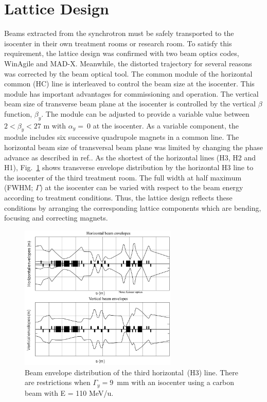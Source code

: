\documentclass[jkps,preprint,fleqn,showpacs,showkeys,10pt,twocolumn]{revtex4}
\begin{document}
\section{Lattice Design}
\label{sec:Lat}
Beams extracted from the synchrotron must be safely transported to the isocenter in their own treatment rooms or research room.
To satisfy this requirement, the lattice design was confirmed with two beam optics codes, WinAgile\cite{Agile0,Agile1} and MAD-X\cite{Schmidt}.
Meanwhile, the distorted trajectory for several reasons was corrected by the beam optical tool\cite{Chawon}.
The common module of the horizontal common (HC) line is interleaved to control the beam size at the isocenter.
This module has important advantages for commissioning and operation. 
The vertical beam size of transverse beam plane at the isocenter is controlled by the vertical $\beta$ function, $\beta_{y}$.  
The module can be adjusted to provide a variable value between $2 < \beta_{y} < 27$ m with $\alpha_{y} = ~0$ at the isocenter. 
As a variable component, the module includes six successive quadrupole magnets in a common line.
The horizontal beam size of transversal beam plane was limited by changing the phase advance as described in ref.\cite{Chawon}. 
As the shortest of the horizontal lines (H3, H2 and H1), 
Fig.~\ref{fig1} shows transverse envelope distribution by the horizontal H3 line to the isocenter of the third treatment room. 
The full width at half maximum (FWHM; $\Gamma$) at the isocenter can be varied with respect to the beam energy according to treatment conditions.
Thus, the lattice design reflects these conditions by arranging the corresponding lattice components which are bending, focusing and correcting magnets.
\begin{figure}[h]
  \begin{center}
    \includegraphics[width=7.5cm]{Fig02.png}  
    \caption{Beam envelope distribution of the third horizontal~(H3) line.
      There are restrictions when $\Gamma_{y} = 9$~mm with an isocenter using a carbon beam with E = 110 MeV/u.}
    \label{fig1}
  \end{center}
\end{figure}
\end{document}
